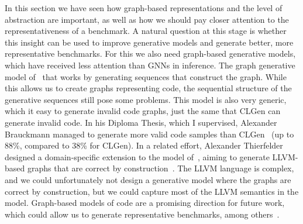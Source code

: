In this section we have seen how graph-based representations and the level of abstraction are important, as well as how we should pay closer attention to the representativeness of a benchmark.
A natural question at this stage is whether this insight can be used to improve generative models and generate better, more representative benchmarks.
For this we also need graph-based generative models, which have received less attention than \acp{GNN} in inference.
The graph generative model of~\cite{li2018learning} that works by generating sequences that construct the graph.
While this allows us to create graphs representing code, the sequential structure of the generative sequences still pose some problems.
This model is also very generic, which it easy to generate invalid code graphs, just the same that CLGen can generate invalid code.
In his Diploma Thesis, which I supervised, Alexander Brauckmann managed to generate more valid code samples than CLGen~\cite{Brauckmann-diplom20} (up to 88\%, compared to 38\% for CLGen).
In a related effort, Alexander Thierfelder designed a domain-specific extension to the model of~\cite{li2018learning}, aiming to generate LLVM-based graphs that are correct by construction~\cite{Thierfelder-master20}.
The LLVM language is complex, and we could unfortunately not design a generative model where the graphs are correct by construction, but we could capture most of the LLVM semantics in the model.
Graph-based models of code are a promising direction for future work, which could allow us to generate representative benchmarks, among others~\cite{leather_fdl20}.